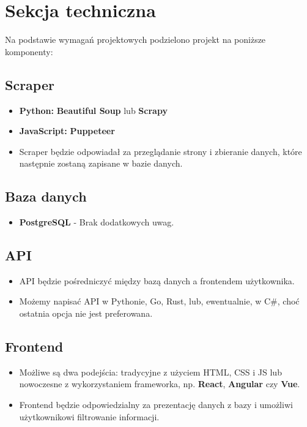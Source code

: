 \documentclass{article}
\begin{document}
\section{Sekcja techniczna}
Na podstawie wymagań projektowych podzielono projekt na poniższe komponenty:

\subsection{Scraper}
\begin{itemize}
  \item \textbf{Python:} \textbf{Beautiful Soup} lub \textbf{Scrapy}
  \item \textbf{JavaScript:} \textbf{Puppeteer}
  \item Scraper będzie odpowiadał za przeglądanie strony i zbieranie danych, które następnie zostaną zapisane w bazie danych.
\end{itemize}

\subsection{Baza danych}
\begin{itemize}
  \item \textbf{PostgreSQL} - Brak dodatkowych uwag.
\end{itemize}

\subsection{API}
\begin{itemize}
  \item API będzie pośredniczyć między bazą danych a frontendem użytkownika.
  \item Możemy napisać API w Pythonie, Go, Rust, lub, ewentualnie, w C\#, choć ostatnia opcja nie jest preferowana.
\end{itemize}

\subsection{Frontend}
\begin{itemize}
  \item Możliwe są dwa podejścia: tradycyjne z użyciem HTML, CSS i JS lub nowoczesne z wykorzystaniem frameworka, np. \textbf{React}, \textbf{Angular} czy \textbf{Vue}.
  \item Frontend będzie odpowiedzialny za prezentację danych z bazy i umożliwi użytkownikowi filtrowanie informacji.
\end{itemize}
\end{document}

